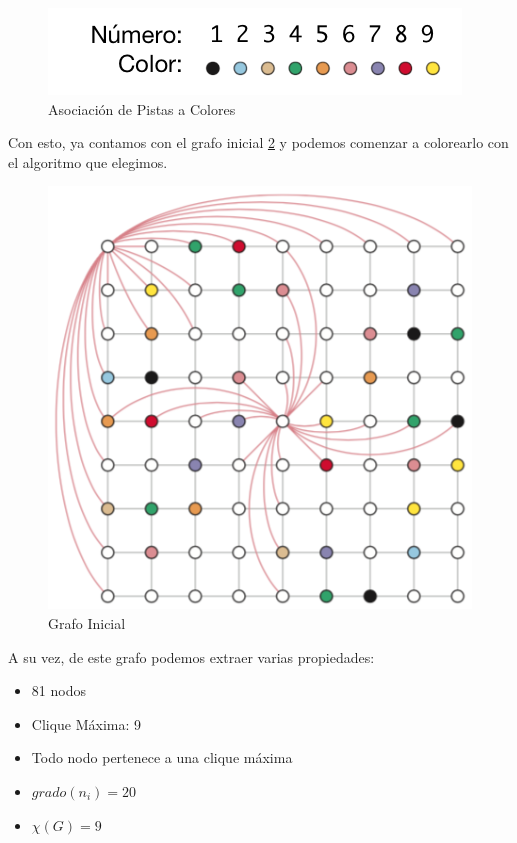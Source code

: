\documentclass[a4paper,spanish]{article}
\begin{document}
\begin{figure}[h]
	\centering
	\includegraphics[scale=0.5]{./img/numero_color.png}
    \caption{Asociación de Pistas a Colores}
    \label{img:color_map}
\end{figure}

\clearpage

Con esto, ya contamos con el grafo inicial \ref{img:grafo_inicial} y podemos
comenzar a colorearlo con el algoritmo que elegimos.

\begin{figure}[h]
	\centering
	\includegraphics[scale=0.5]{./img/grafo_inicial.png}
    \caption{Grafo Inicial}
    \label{img:grafo_inicial}
\end{figure}

A su vez, de este grafo podemos extraer varias propiedades:

\begin{itemize}
	\item 81 nodos
	\item Clique Máxima: 9
	\item Todo nodo pertenece a una clique máxima
	\item $ grado(n_i) = 20 $
	\item $ \chi(G) = 9 $
\end{itemize}
\end{document}
